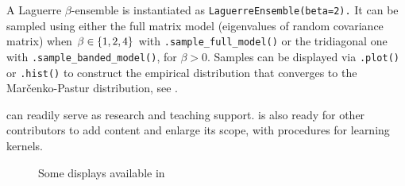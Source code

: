 \documentclass[twoside,11pt]{article}
\begin{document}
    A Laguerre $\beta$-ensemble is instantiated as
    \lstinline{LaguerreEnsemble(beta=2).}
    It can be sampled using either the full matrix model (eigenvalues of random covariance matrix) when $\beta\in\left\{ 1,2,4 \right\}$ with
    \lstinline{.sample_full_model()}
    or the tridiagonal one with
    \lstinline{.sample_banded_model()}, for $\beta > 0$.
    Samples can be displayed via
    \lstinline{.plot()} or
    \lstinline{.hist()} to construct the empirical distribution that converges to the Mar\v{c}enko-Pastur distribution, see .

    \DPPy can readily serve as research and teaching support.
    \DPPy is also ready for other contributors to add content and enlarge its scope, \eg with procedures for learning kernels.

    \begin{figure}[!hb]
        \vspace{-8pt}
        \centering
        \vspace{-12pt}
        \caption{Some displays available in \DPPy}
        \label{fig:DPPy_figs}
        \vspace{-10em}
    \end{figure}
\end{document}
